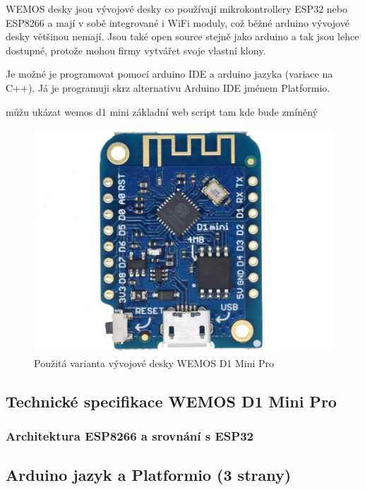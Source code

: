 WEMOS desky jsou vývojové desky co používají mikrokontrollery ESP32 nebo ESP8266 a mají v sobě integrované i WiFi moduly, což běžné arduino vývojové desky většinou nemají. Jsou také open source stejně jako arduino a tak jsou lehce dostupné, protože mohou firmy vytvářet svoje vlastní klony.

Je možné je programovat pomocí arduino IDE a arduino jazyka (variace na C++). Já je programuji skrz alternativu Arduino IDE jménem Platformio.

můžu ukázat wemos d1 mini základní web script tam kde bude zmíněný \cite{NavodNaESPWebServerDratek}


\begin{figure}[H]
    \centering
    \includegraphics[width=0.5\linewidth]{images/WEMOS_D1_Mini_Pro.jpg}
    \caption{Použitá varianta vývojové desky WEMOS D1 Mini Pro \cite{WEMOSD1MiniPro}}
    \label{fig:WEMOSD1MiniPro}
\end{figure}

\subsection{Technické specifikace WEMOS D1 Mini Pro}

\subsubsection{Architektura ESP8266 a srovnání s ESP32}

\subsection{Arduino jazyk a Platformio (3 strany)}

